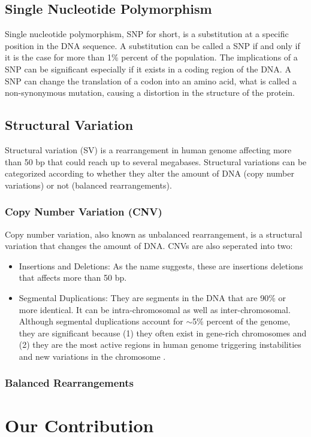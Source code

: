 \subsection{Single Nucleotide Polymorphism}
Single nucleotide polymorphism, SNP for short, is a substitution at a specific position in the DNA sequence. A substitution can be called a SNP if and only if it is the case for more than 1\% percent of the population. The implications of a SNP can be significant especially if it exists in a coding region of the DNA. A SNP can change the translation of a codon into an amino acid, what is called a non-synonymous mutation, causing a distortion in the structure of the protein. 


\subsection{Structural Variation}
Structural variation (SV) is a rearrangement in human genome affecting more than 50 bp that could reach up to several megabases. Structural variations can be categorized according to whether they alter the amount of DNA (copy number variations) or not (balanced rearrangements). 

\subsubsection{Copy Number Variation (CNV)}
Copy number variation, also known as unbalanced rearrangement, is a structural variation that changes the amount of DNA. CNVs are also seperated into two:
\begin{itemize}
  \item Insertions and Deletions: As the name suggests, these are insertions deletions that affects more than 50 bp.
  \item Segmental Duplications: They are segments in the DNA that are 90\% or more identical. It can be intra-chromosomal as well as inter-chromosomal. Although segmental duplications account for $\sim$5\% percent of the genome, they are significant because (1) they often exist in gene-rich chromosomes \cite{bailey2002recent} and (2) they are the most active regions in human genome triggering instabilities and new variations in the chromosome \cite{samonte2002segmental}.
\end{itemize}
\subsubsection{Balanced Rearrangements}

\section{Our Contribution}
\newpage

